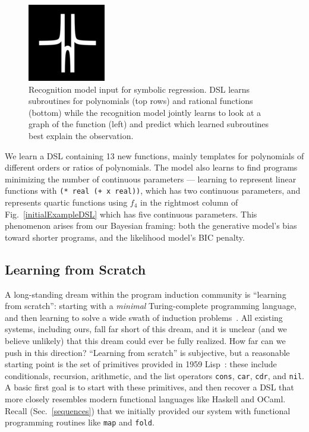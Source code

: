 \documentclass{article}
\newcommand{\code}[1]{{\footnotesize\texttt{#1}}}
\begin{document}
\begin{figure}
\begin{minipage}[c]{0.3\columnwidth}
    \includegraphics[width = \functionSize]{figures/functions/149.png}
  \end{minipage}
  \begin{minipage}[c]{0.69\columnwidth}    
    \caption{Recognition model input for symbolic regression. DSL learns subroutines for polynomials (top rows) and rational functions (bottom) while the recognition  model jointly learns to look at a graph of the function (left) and predict which learned subroutines best explain the observation.}\label{functions}\vspace{-1cm}
        \end{minipage}
\end{figure}
We learn a DSL containing 13 new functions,
mainly templates for polynomials of different orders or ratios of polynomials.
The model also learns to find programs minimizing the number of continuous parameters ---
learning to represent linear functions with 
\code{(* real (+ x real))}, which has two continuous parameters, and represents quartic functions using $f_4$ in the rightmost column of Fig.~\ref{initialExampleDSL}
which has five continuous parameters.
This phenomenon arises from our Bayesian framing:
both the generative model's bias toward shorter programs,
and the likelihood model's BIC penalty.

\subsection{Learning from Scratch}
A long-standing dream within the program induction community
is ``learning from scratch'': starting with a \emph{minimal} Turing-complete programming language,
and then learning to solve a wide swath of
induction problems~\cite{solomonoff1964formal,schmidhuber2004optimal,hutter2004universal,solomonoff1989system}.
All existing systems,
including ours,
fall far short of this dream,
and it is unclear (and we believe unlikely)
that this dream could ever be fully realized.
How far can we push in this direction?
``Learning from scratch'' is subjective, but a reasonable
starting point is the set of primitives provided in 1959
Lisp~\cite{mccarthy1960recursive}: these include
conditionals, recursion, arithmetic, and the 
list operators \code{cons}, \code{car}, \code{cdr}, and \code{nil}.
A  basic first goal is to start with
these primitives,
and then recover a DSL that
more closely resembles modern functional languages like Haskell and OCaml.
Recall (Sec.~\ref{sequences})
that we initially provided our system with functional programming routines like
\code{map} and \code{fold}.
\end{document}
